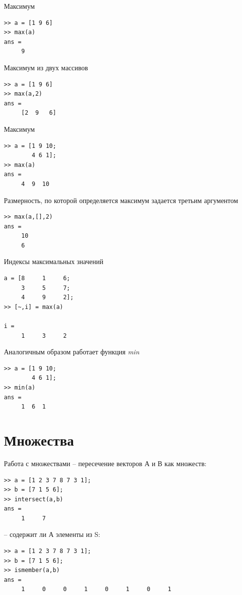 \documentclass[11pt, compress]{beamer}
\begin{document}
\begin{frame}[fragile]{Максимум}
\begin{lstlisting}
>> a = [1 9 6]
>> max(a)
ans = 
     9
\end{lstlisting}
Максимум из двух массивов
\begin{lstlisting}
>> a = [1 9 6]
>> max(a,2)
ans = 
     [2  9   6]
\end{lstlisting}
\end{frame}

\begin{frame}[fragile]{Максимум}
\begin{lstlisting}
>> a = [1 9 10;
        4 6 1];
>> max(a)
ans = 
     4  9  10
\end{lstlisting}
Размерность, по которой определяется максимум задается третьим аргументом  
\begin{lstlisting}
>> max(a,[],2)
ans = 
     10
     6
\end{lstlisting}
\end{frame}

\begin{frame}[fragile]{Индексы максимальных значений}
\begin{lstlisting}
a = [8     1     6;
     3     5     7;
     4     9     2];
>> [~,i] = max(a)

i =
     1     3     2
\end{lstlisting}
Аналогичным образом работает функция \emph{min}
\begin{lstlisting}
>> a = [1 9 10;
        4 6 1];
>> min(a)
ans = 
     1  6  1
\end{lstlisting}
\end{frame}

\section{Множества}

\begin{frame}[fragile]{Работа с множествами}
   -- пересечение векторов А и В как множеств:
\begin{lstlisting}
>> a = [1 2 3 7 8 7 3 1];
>> b = [7 1 5 6];
>> intersect(a,b)
ans =
     1     7 
\end{lstlisting}
 -- содержит ли А элементы из S:
\begin{lstlisting}
>> a = [1 2 3 7 8 7 3 1];
>> b = [7 1 5 6];
>> ismember(a,b)
ans =
     1     0     0     1     0     1     0     1
\end{lstlisting}
\end{frame}
\end{document}
